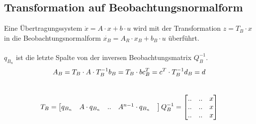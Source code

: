 \subsection{Transformation auf Beobachtungsnormalform}
Eine Übertragungssystem $\dot{x}=A\cdot x +  b \cdot u$ wird mit der Transformation  $z=T_B\cdot x$ in die Beobachtungsnormalform $\dot{x_B}=A_R\cdot x_B +  b_B \cdot u$ überführt.\\
\\
$q_{B_n}$ ist die letzte Spalte von der inversen Beobachtungsmatrix $Q_B^{-1}$.
\\
\[
	A_B = T_B\cdot A \cdot T_B^{-1}	\\	b_B = T_B\cdot b	\\	c_B^T = c^T\cdot T_B^{-1}	\\	d_B = d
\]
\\
\[
	T_B=
	\begin{bmatrix}
		q_{B_n} & A\cdot q_{B_n} &  ..& A^{n-1}\cdot q_{B_n} & \\
	\end{bmatrix}	\\
	Q_B^{-1} =
	\begin{bmatrix}
			 .. & .. & x\\
			 .. & .. & x\\
			 .. & .. & x\\	 
	\end{bmatrix}
\]